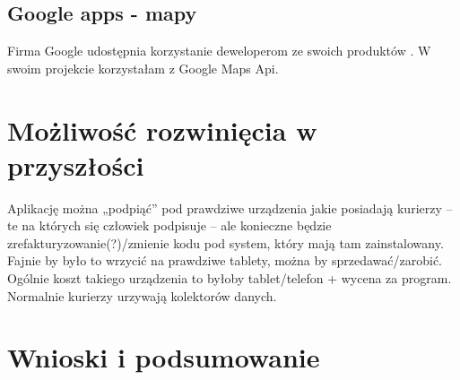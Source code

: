 \documentclass[eng,printmode,oneside]{mgr}
\begin{document}
\section{Google apps - mapy}

Firma Google udostępnia korzystanie deweloperom ze swoich produktów
\cite{developer.google}. W swoim projekcie korzystałam z Google Maps Api. 

\chapter{Możliwość rozwinięcia w przyszłości}
Aplikację można „podpiąć” pod prawdziwe urządzenia jakie posiadają kurierzy – te na których się człowiek podpisuje – ale konieczne będzie 
zrefakturyzowanie(?)/zmienie kodu pod system, który mają tam zainstalowany.
	Fajnie by było to wrzycić na prawdziwe tablety, można by sprzedawać/zarobić. Ogólnie koszt takiego urządzenia to byłoby tablet/telefon 
	+ wycena za program.
	Normalnie kurierzy urzywają kolektorów danych.

\chapter{Wnioski i podsumowanie}

\listoffigures
\listoftables
\lstlistoflistings
\end{document}
